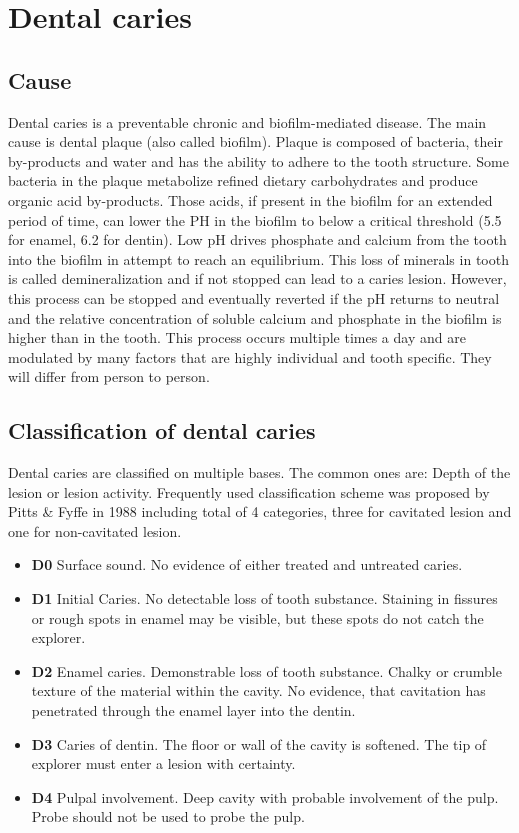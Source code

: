 \section{Dental caries}

\subsection{Cause}
Dental caries is a preventable chronic and biofilm-mediated disease. The main cause is dental plaque (also called biofilm). Plaque is composed of bacteria, their by-products and water and has the ability to adhere to the tooth structure. Some bacteria in the plaque metabolize refined dietary carbohydrates and produce organic acid by-products. Those acids, if present in the biofilm for an extended period of time, can lower the PH in the biofilm to below a critical threshold (5.5 for enamel, 6.2 for dentin). Low pH drives phosphate and calcium from the tooth into the biofilm in attempt to reach an equilibrium. This loss of minerals in tooth is called demineralization and if not stopped can lead to a caries lesion. However, this process can be stopped and eventually reverted if the pH returns to neutral and the relative concentration of soluble calcium and phosphate in the biofilm is higher than in the tooth. This process occurs multiple times a day and are modulated by many factors that are highly individual and tooth specific. They will differ from person to person.


\subsection{Classification of dental caries}
Dental caries are classified on multiple bases. The common ones are: Depth of the lesion or lesion activity. \newline
Frequently used classification scheme was proposed by Pitts \& Fyffe in 1988 including total of 4 categories, three for cavitated lesion and one for non-cavitated lesion.
\begin{itemize}
    \item \textbf{D0} Surface sound. No evidence of either treated and untreated caries.
    \item \textbf{D1} Initial Caries. No detectable loss of tooth substance. Staining in fissures or rough spots in enamel may be visible, but these spots do not catch the explorer.
    \item \textbf{D2} Enamel caries. Demonstrable loss of tooth substance. Chalky or crumble texture of the material within the cavity. No evidence, that cavitation has penetrated through the enamel layer into the dentin.
    \item \textbf{D3} Caries of dentin. The floor or wall of the cavity is softened. The tip of explorer must enter a lesion with certainty.
    \item \textbf{D4} Pulpal involvement. Deep cavity with probable involvement of the pulp. Probe should not be used to probe the pulp.
\end{itemize}

